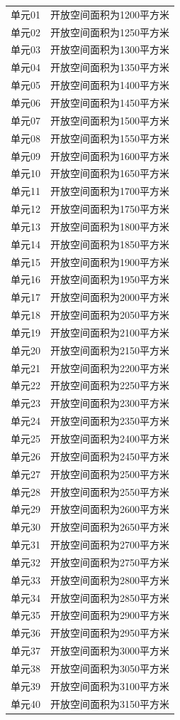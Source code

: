 \documentclass{lunwen}
\begin{document}
\begin{longtable}{p{25mm}p{108mm}}
  单元01 & 开放空间面积为1200平方米\\
  单元02 & 开放空间面积为1250平方米\\
  单元03 & 开放空间面积为1300平方米\\
  单元04 & 开放空间面积为1350平方米\\
  单元05 & 开放空间面积为1400平方米\\
  单元06 & 开放空间面积为1450平方米\\
  单元07 & 开放空间面积为1500平方米\\
  单元08 & 开放空间面积为1550平方米\\
  单元09 & 开放空间面积为1600平方米\\
  单元10 & 开放空间面积为1650平方米\\
  单元11 & 开放空间面积为1700平方米\\
  单元12 & 开放空间面积为1750平方米\\
  单元13 & 开放空间面积为1800平方米\\
  单元14 & 开放空间面积为1850平方米\\
  单元15 & 开放空间面积为1900平方米\\
  单元16 & 开放空间面积为1950平方米\\
  单元17 & 开放空间面积为2000平方米\\
  单元18 & 开放空间面积为2050平方米\\
  单元19 & 开放空间面积为2100平方米\\
  单元20 & 开放空间面积为2150平方米\\
  单元21 & 开放空间面积为2200平方米\\
  单元22 & 开放空间面积为2250平方米\\
  单元23 & 开放空间面积为2300平方米\\
  单元24 & 开放空间面积为2350平方米\\
  单元25 & 开放空间面积为2400平方米\\
  单元26 & 开放空间面积为2450平方米\\
  单元27 & 开放空间面积为2500平方米\\
  单元28 & 开放空间面积为2550平方米\\
  单元29 & 开放空间面积为2600平方米\\
  单元30 & 开放空间面积为2650平方米\\
  单元31 & 开放空间面积为2700平方米\\
  单元32 & 开放空间面积为2750平方米\\
  单元33 & 开放空间面积为2800平方米\\
  单元34 & 开放空间面积为2850平方米\\
  单元35 & 开放空间面积为2900平方米\\
  单元36 & 开放空间面积为2950平方米\\
  单元37 & 开放空间面积为3000平方米\\
  单元38 & 开放空间面积为3050平方米\\
  单元39 & 开放空间面积为3100平方米\\
  单元40 & 开放空间面积为3150平方米\\
\end{longtable}
\endgroup
\end{document}
